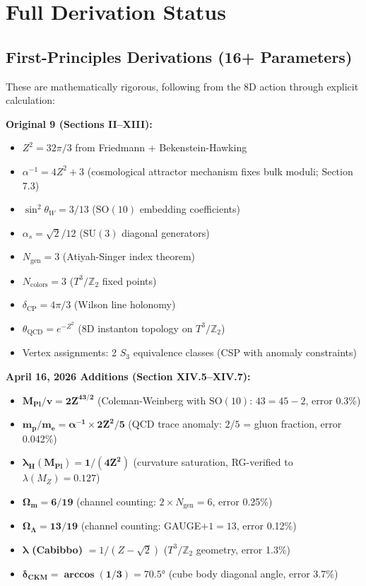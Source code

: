 \documentclass[11pt,a4paper]{article}
\theoremstyle{plain}
\theoremstyle{definition}
\theoremstyle{remark}
\newcommand{\Mpl}{M_{\text{Pl}}}
\newcommand{\MZ}{M_Z}
\newcommand{\Ngen}{N_{\text{gen}}}
\newcommand{\alphas}{\alpha_s}
\newcommand{\thetaW}{\theta_W}
\newcommand{\Omegam}{\Omega_m}
\newcommand{\OmegaL}{\Omega_\Lambda}
\newcommand{\Tthree}{T^3}
\newcommand{\Ztwo}{\mathbb{Z}_2}
\newcommand{\SOten}{\text{SO}(10)}
\newcommand{\SUthree}{\text{SU}(3)}
\begin{document}
\section{Full Derivation Status}

\subsection{First-Principles Derivations (16+ Parameters)}

These are mathematically rigorous, following from the 8D action through explicit calculation:

\textbf{Original 9 (Sections II--XIII):}
\begin{itemize}
  \item $Z^2 = 32\pi/3$ from Friedmann + Bekenstein-Hawking
  \item $\alpha^{-1} = 4Z^2 + 3$ (cosmological attractor mechanism fixes bulk moduli; Section 7.3)
  \item $\sin^2\thetaW = 3/13$ ($\SOten$ embedding coefficients)
  \item $\alphas = \sqrt{2}/12$ ($\SUthree$ diagonal generators)
  \item $\Ngen = 3$ (Atiyah-Singer index theorem)
  \item $N_{\text{colors}} = 3$ ($\Tthree/\Ztwo$ fixed points)
  \item $\delta_{\text{CP}} = 4\pi/3$ (Wilson line holonomy)
  \item $\theta_{\text{QCD}} = e^{-Z^2}$ (8D instanton topology on $\Tthree/\Ztwo$)
  \item Vertex assignments: 2 $S_3$ equivalence classes (CSP with anomaly constraints)
\end{itemize}

\textbf{April 16, 2026 Additions (Section XIV.5--XIV.7):}
\begin{itemize}
  \item $\mathbf{\Mpl/v = 2Z^{43/2}}$ (Coleman-Weinberg with $\SOten$: $43 = 45 - 2$, error 0.3\%)
  \item $\mathbf{m_p/m_e = \alpha^{-1} \times 2Z^2/5}$ (QCD trace anomaly: $2/5$ = gluon fraction, error 0.042\%)
  \item $\mathbf{\lambda_H(\Mpl) = 1/(4Z^2)}$ (curvature saturation, RG-verified to $\lambda(\MZ) = 0.127$)
  \item $\mathbf{\Omegam = 6/19}$ (channel counting: $2 \times \Ngen = 6$, error 0.25\%)
  \item $\mathbf{\OmegaL = 13/19}$ (channel counting: GAUGE$+1 = 13$, error 0.12\%)
  \item $\mathbf{\lambda}$ \textbf{(Cabibbo)} $= 1/(Z - \sqrt{2})$ ($\Tthree/\Ztwo$ geometry, error 1.3\%)
  \item $\mathbf{\delta_{\text{CKM}} = \arccos(1/3) = 70.5°}$ (cube body diagonal angle, error 3.7\%)
\end{itemize}
\end{document}

